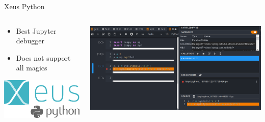 \documentclass[bigger,unknownkeysallowed,aspectratio=169,red,colorblocks]{beamer}
\begin{document}
\begin{frame}[label={sec:org769cec6}]{Xeus Python}
\begin{columns}
\begin{column}{0.4\columnwidth}
\begin{itemize}
\item Best Jupyter debugger
\item Does not support all magics
\end{itemize}

\begin{center}
\includegraphics[width=.9\linewidth]{images/A_screenshot/2020-09-20_07-40-27_screenshot.png}
\end{center}
\end{column}


\begin{column}{0.6\columnwidth}
\begin{center}
\includegraphics[width=.9\linewidth]{images/Xeus_Python/2020-09-20_07-39-12_screenshot.png}
\end{center}
\end{column}
\end{columns}
\end{frame}
\end{document}
